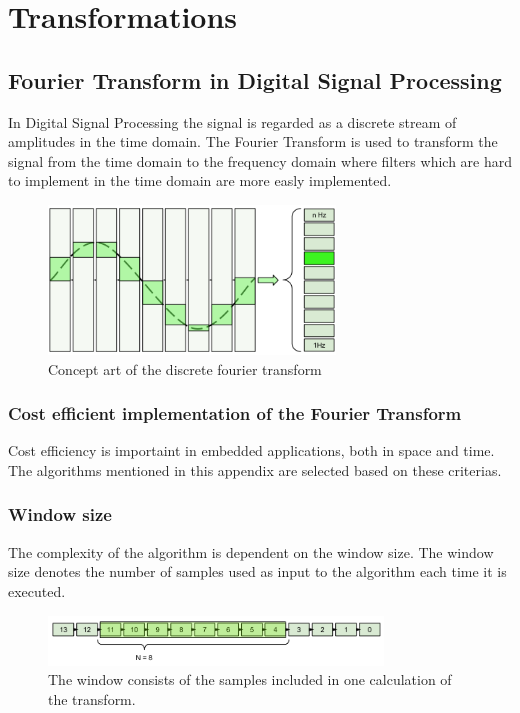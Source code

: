 \chapter{Transformations}
\section{Fourier Transform in Digital Signal Processing}\label{appendix:FT_in_DSP}

In Digital Signal Processing the signal is regarded as a discrete stream of amplitudes in the
time domain. The Fourier Transform is used to transform the signal from the time domain 
to the frequency domain where filters which are hard to implement in the time domain are
more easly implemented.

\begin{figure}[H]
    \centering
    \includegraphics[height=150px]{figures/theory/ft_conceptual}
    \caption{Concept art of the discrete fourier transform}
    \label{fig:ft_conceptual}
\end{figure}
\subsection{Cost efficient implementation of the Fourier Transform}

Cost efficiency is importaint in embedded applications, both in space and time. 
The algorithms mentioned in this appendix are selected based on these criterias.

\subsection{Window size}

The complexity of the algorithm is dependent on the window size. The window size
denotes the number of samples used as input to the algorithm each time it is executed.

\begin{figure}[H]
    \centering
    \includegraphics[height=50px]{figures/theory/dft_window}
    \caption{The window consists of the samples included in one calculation of the transform.}
    \label{fig:dft_window}
\end{figure}

